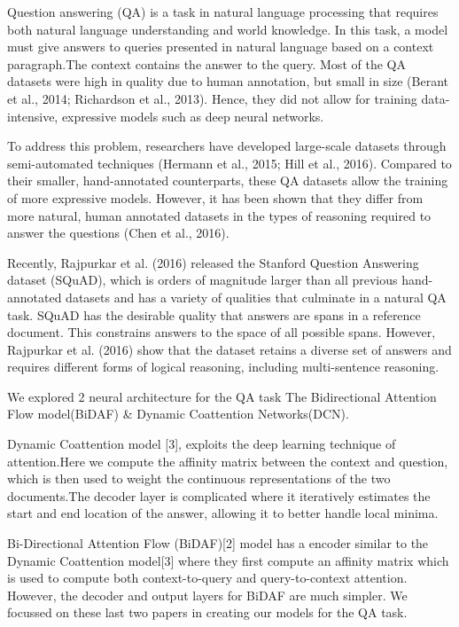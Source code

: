 \documentclass{article} %
\begin{document}
Question answering (QA) is a task in natural language processing that requires both natural language understanding and world knowledge. In this task, a model must give answers to queries presented in natural language based on a context paragraph.The context contains the answer to the query.
Most of the QA datasets were high in quality due to human annotation, but small in size (Berant et al., 2014; Richardson et al., 2013). Hence, they did not allow for training data-intensive, expressive models such as deep neural networks.

To address this problem, researchers have developed large-scale datasets through semi-automated techniques (Hermann et al., 2015; Hill et al., 2016). Compared to their smaller, hand-annotated counterparts, these QA datasets allow the training of more expressive models. However, it has been shown that they differ from more natural, human annotated datasets in the types of reasoning required to answer the questions (Chen et al., 2016).

Recently, Rajpurkar et al. (2016) released the Stanford Question Answering dataset (SQuAD), which is orders of magnitude larger than all previous hand-annotated datasets and has a variety of qualities that culminate in a natural QA task. SQuAD has the desirable quality that answers are spans in a reference document. This constrains answers to the space of all possible spans. However, Rajpurkar et al. (2016) show that the dataset retains a diverse set of answers and requires different forms of logical reasoning, including multi-sentence reasoning.

We explored 2 neural architecture for the QA task The Bidirectional Attention Flow model(BiDAF) \& Dynamic Coattention Networks(DCN).

Dynamic Coattention model [3], exploits the deep learning technique of attention.Here we compute the affinity matrix between the context and question, which is then used to weight the continuous representations of the two documents.The decoder layer is complicated where it iteratively  estimates the start and end location of the answer, allowing it to better handle local minima. 

Bi-Directional Attention Flow (BiDAF)[2] model  has a encoder similar to the Dynamic Coattention model[3] where they first compute an affinity matrix which is used to compute both context-to-query and query-to-context attention. However, the decoder and output layers for BiDAF are much simpler.
We focussed on these last two papers in creating our models for the QA task.
\end{document}

